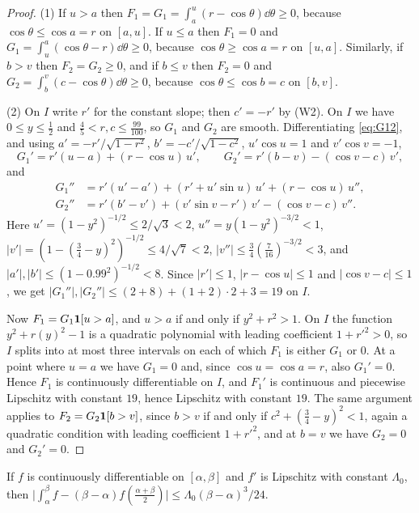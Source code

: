 \documentclass[11pt,colorlinks]{charlie}
\begin{document}
\begin{proof}
(1) If $u>a$ then $F_1=G_1=\int_a^u(r-\cos\theta)\dd\theta\ge0$, because $\cos\theta\le\cos a=r$ on $[a,u]$. If $u\le a$ then $F_1=0$ and $G_1=\int_u^a(\cos\theta-r)\dd\theta\ge0$, because $\cos\theta\ge\cos a=r$ on $[u,a]$. Similarly, if $b>v$ then $F_2=G_2\ge0$, and if $b\le v$ then $F_2=0$ and $G_2=\int_b^v(c-\cos\theta)\dd\theta\ge0$, because $\cos\theta\le\cos b=c$ on $[b,v]$.

(2) On $I$ write $r'$ for the constant slope; then $c'=-r'$ by (W2). On $I$ we have $0\le y\le\tfrac12$ and $\tfrac45<r,c\le\tfrac{99}{100}$, so $G_1$ and $G_2$ are smooth. Differentiating \eqref{eq:G12}, and using $a'=-r'/\sqrt{1-r^2}$, $b'=-c'/\sqrt{1-c^2}$, $u'\cos u=1$ and $v'\cos v=-1$,
\[
 G_1'=r'(u-a)+(r-\cos u)\,u',\qquad G_2'=r'(b-v)-(\cos v-c)\,v',
\]
and
\begin{align*}
 G_1''&=r'(u'-a')+(r'+u'\sin u)\,u'+(r-\cos u)\,u'',\\
 G_2''&=r'(b'-v')+(v'\sin v-r')\,v'-(\cos v-c)\,v''.
\end{align*}
Here $u'=(1-y^2)^{-1/2}\le2/\sqrt3<2$, $u''=y(1-y^2)^{-3/2}<1$, $|v'|=(1-(\tfrac34-y)^2)^{-1/2}\le4/\sqrt7<2$, $|v''|\le\tfrac34(\tfrac7{16})^{-3/2}<3$, and $|a'|,|b'|\le(1-0.99^2)^{-1/2}<8$. Since $|r'|\le1$, $|r-\cos u|\le1$ and $|\cos v-c|\le1$, we get $|G_1''|,|G_2''|\le(2+8)+(1+2)\cdot2+3=19$ on $I$.

Now $F_1=G_1\mathbf{1}[u>a]$, and $u>a$ if and only if $y^2+r^2>1$. On $I$ the function $y^2+r(y)^2-1$ is a quadratic polynomial with leading coefficient $1+r'^2>0$, so $I$ splits into at most three intervals on each of which $F_1$ is either $G_1$ or $0$. At a point where $u=a$ we have $G_1=0$ and, since $\cos u=\cos a=r$, also $G_1'=0$. Hence $F_1$ is continuously differentiable on $I$, and $F_1'$ is continuous and piecewise Lipschitz with constant $19$, hence Lipschitz with constant $19$. The same argument applies to $F_2=G_2\mathbf{1}[b>v]$, since $b>v$ if and only if $c^2+(\tfrac34-y)^2<1$, again a quadratic condition with leading coefficient $1+r'^2$, and at $b=v$ we have $G_2=0$ and $G_2'=0$.
\end{proof}

\begin{lemma}\label{lem:midpoint}
If $f$ is continuously differentiable on $[\alpha,\beta]$ and $f'$ is Lipschitz with constant $\Lambda_0$, then $\big|\int_\alpha^\beta f-(\beta-\alpha)f(\tfrac{\alpha+\beta}2)\big|\le\Lambda_0(\beta-\alpha)^3/24$.
\end{lemma}
\end{document}
